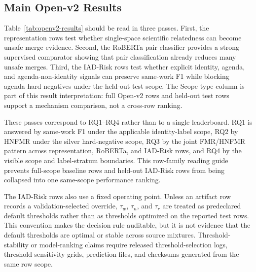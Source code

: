 \documentclass[preprint,12pt]{elsarticle}
\begin{document}
\subsection{Main Open-v2 Results}

Table~\ref{tab:openv2-results} should be read in three passes. First, the representation rows test whether single-space scientific relatedness can become unsafe merge evidence. Second, the RoBERTa pair classifier provides a strong supervised comparator showing that pair classification already reduces many unsafe merges. Third, the IAD-Risk rows test whether explicit identity, agenda, and agenda-non-identity signals can preserve same-work F1 while blocking agenda hard negatives under the held-out test scope. The Scope type column is part of this result interpretation: full Open-v2 rows and held-out test rows support a mechanism comparison, not a cross-row ranking.

These passes correspond to RQ1--RQ4 rather than to a single leaderboard. RQ1 is answered by same-work F1 under the applicable identity-label scope, RQ2 by HNFMR under the silver hard-negative scope, RQ3 by the joint FMR/HNFMR pattern across representation, RoBERTa, and IAD-Risk rows, and RQ4 by the visible scope and label-stratum boundaries. This row-family reading guide prevents full-scope baseline rows and held-out IAD-Risk rows from being collapsed into one same-scope performance ranking.

The IAD-Risk rows also use a fixed operating point. Unless an artifact row records a validation-selected override, $\tau_w$, $\tau_n$, and $\tau_r$ are treated as predeclared default thresholds rather than as thresholds optimized on the reported test rows. This convention makes the decision rule auditable, but it is not evidence that the default thresholds are optimal or stable across source mixtures. Threshold-stability or model-ranking claims require released threshold-selection logs, threshold-sensitivity grids, prediction files, and checksums generated from the same row scope.
\end{document}
